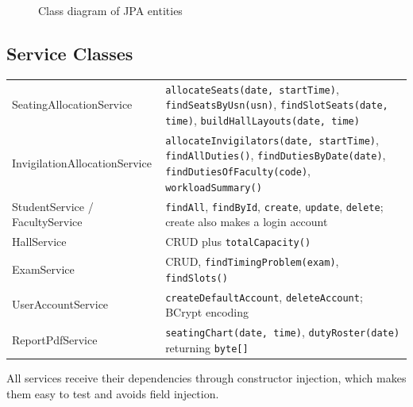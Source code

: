 \documentclass[11pt,a4paper]{article}
\begin{document}
\begin{figure}[H]
\caption{Class diagram of JPA entities}\label{fig:class}
\end{figure}

\subsection{Service Classes}
\begin{tabularx}{\linewidth}{|L{4.4cm}|X|}
\hline\headrow{} & \\\hline
SeatingAllocationService & \texttt{allocateSeats(date, startTime)}, \texttt{findSeatsByUsn(usn)}, \texttt{findSlotSeats(date, time)}, \texttt{buildHallLayouts(date, time)}\\\hline
InvigilationAllocationService & \texttt{allocateInvigilators(date, startTime)}, \texttt{findAllDuties()}, \texttt{findDutiesByDate(date)}, \texttt{findDutiesOfFaculty(code)}, \texttt{workloadSummary()}\\\hline
StudentService / FacultyService & \texttt{findAll}, \texttt{findById}, \texttt{create}, \texttt{update}, \texttt{delete}; create also makes a login account\\\hline
HallService & CRUD plus \texttt{totalCapacity()}\\\hline
ExamService & CRUD, \texttt{findTimingProblem(exam)}, \texttt{findSlots()}\\\hline
UserAccountService & \texttt{createDefaultAccount}, \texttt{deleteAccount}; BCrypt encoding\\\hline
ReportPdfService & \texttt{seatingChart(date, time)}, \texttt{dutyRoster(date)} returning \texttt{byte[]}\\\hline
\end{tabularx}

All services receive their dependencies through constructor injection, which makes them easy to test and avoids field injection.
\end{document}

